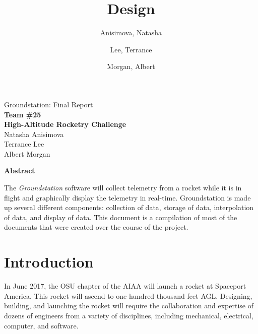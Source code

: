 \documentclass[10pt,draftclsnofoot,onecolumn]{IEEEtran}
\begin{document}
	\singlespace

	\title{\vspace{2in}Design}

	\author {
		Anisimova, Natasha
		\and
		Lee, Terrance
		\and
		Morgan, Albert
	}


	\pagestyle{empty}
	\vspace*{2in}
	\begin{center}
		\huge
		Groundstation: Final Report\\
		\normalsize
		\vspace{5mm}
		\textbf{
			Team \#25\\
			High-Altitude Rocketry Challenge\\
		}
		\vspace{1mm}
		Natasha Anisimova\\
		Terrance Lee\\
		Albert Morgan
	\end{center}

	\vspace{5mm}

	\begin{center}
		\textbf{Abstract}
	\end{center}


	The \textit{Groundstation} software will collect telemetry from a rocket while it is in flight and graphically display the telemetry in real-time. Groundstation is made up several different components: collection of data, storage of data, interpolation of data, and
	display of data.
	This document is a compilation of most of the documents that were created over the course of the project.

	\pagestyle{headings}

	\newpage

	\tableofcontents
	\newpage

\section{Introduction}
	In June 2017, the \ac{OSU} chapter of the
	\ac{AIAA} will launch a rocket at Spaceport America.
	This rocket will ascend to one hundred thousand feet \ac{AGL}.
	Designing, building, and launching the rocket will require the
	collaboration and expertise of dozens of engineers from a variety
	of disciplines, including mechanical, electrical, computer, and
	software.
\end{document}
